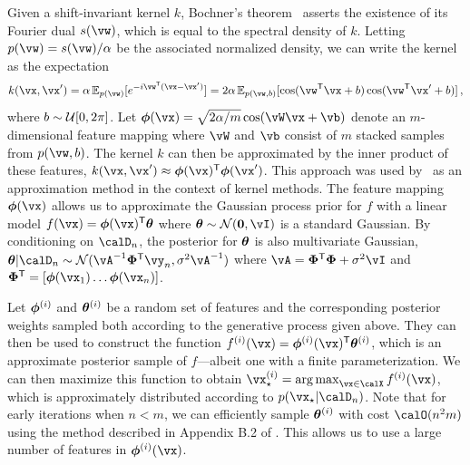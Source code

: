 Given a shift-invariant kernel $k$, Bochner's theorem~\citep{Bochner:1959}
asserts the existence of its Fourier dual $s(\vw)$, which is equal to the
spectral density of $k$.  Letting $p(\vw)=s(\vw)/\alpha$ be the associated normalized
density, we can write the kernel as the expectation
\begin{equation}
    k(\x,\x')
    = \alpha \,\E_{p(\vw)}[e^{-i\vw\T(\x-\x')}]
    = 2\alpha \,\E_{p(\vw,b)}[\cos(\vw\T\vx+b)\cos(\vw\T\vx' + b)]\,,
    \label{eq:kernel_approx}
\end{equation}
where $b\sim\mathcal{U}[0,2\pi]$. Let $\vphi(\vx)=\sqrt{2\alpha/m} \cos(\vW\x +
\vb)$ denote an $m$-dimensional feature mapping where $\vW$ and $\vb$ consist
of $m$ stacked samples from $p(\vw,b)$. The
kernel $k$ can then be approximated by the inner product of these features,
$k(\x,\x')\approx \vphi(\x)\T\vphi(\x')$. This approach was used
by~\cite{Rahimi:2007} as an approximation method in the context of kernel
methods.  The feature mapping $\vphi(\x)$ allows us to approximate the Gaussian
process prior for $f$ with a linear model $f(\x)=\vphi(\vx)\T\vtheta$ where
$\vtheta\sim\Normal(\zero, \vI)$ is a standard Gaussian.  By conditioning on
$\D_n$, the posterior for $\boldsymbol{\theta}$ is also multivariate Gaussian,
$\vtheta|\D_n\sim\Normal(\vA^{-1}\vPhi\T \vy_n, \sigma^2\vA^{-1})$ where
$\vA=\vPhi\T\vPhi+\sigma^2\vI$ and $\vPhi\T=[\vphi(\x_1)\dots\vphi(\x_n)]$.

Let $\boldsymbol{\phi}^{(i)}$ and $\boldsymbol{\theta}^{(i)}$ be a random set of
features and the corresponding posterior weights sampled both according to the generative process given
above. They can then be used to construct the function
$f\i(\x)=\vphi\i(\vx)\T\vtheta\i$, which is an approximate posterior sample of
$f$---albeit one with a finite parameterization. We can then maximize this
function to obtain $\xopt\i=\argmax_{\x\in\X} f\i(\vx)$, which is 
approximately distributed according to $p(\xopt|\D_n)$. Note that for early
iterations when $n < m$, we can efficiently sample $\boldsymbol{\theta}^{(i)}$ with cost
$\calO(n^2m)$ using the method described in Appendix B.2 of \cite{Seeger:2008}.
This allows us to use a large number of features in $\vphi\i(\x)$.

